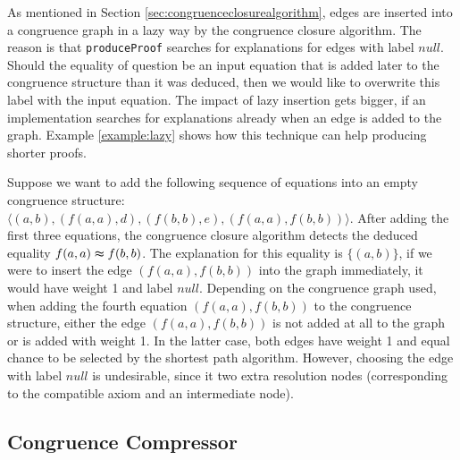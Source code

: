 As mentioned in Section \ref{sec:congruenceclosurealgorithm}, edges are inserted into a congruence graph in a lazy way by the congruence closure algorithm.
The reason is that \texttt{produceProof} searches for explanations for edges with label $null$.
Should the equality of question be an input equation that is added later to the congruence structure than it was deduced, then we would like to overwrite this label with the input equation.
The impact of lazy insertion gets bigger, if an implementation searches for explanations already when an edge is added to the graph.
Example \ref{example:lazy} shows how this technique can help producing shorter proofs.

\begin{example}

Suppose we want to add the following sequence of equations into an empty congruence structure: $\langle (a,b),(f(a,a),d),(f(b,b),e),(f(a,a),f(b,b)) \rangle$.
After adding the first three equations, the congruence closure algorithm detects the deduced equality $f(a,a) \thickapprox f(b,b)$.
The explanation for this equality is $\{(a,b)\}$, if we were to insert the edge $(f(a,a),f(b,b))$ into the graph immediately, it would have weight 1 and label $null$.
Depending on the congruence graph used, when adding the fourth equation $(f(a,a),f(b,b))$ to the congruence structure, either the edge $(f(a,a),f(b,b))$ is not added at all to the graph or is added with weight 1.
In the latter case, both edges have weight 1 and equal chance to be selected by the shortest path algorithm.
However, choosing the edge with label $null$ is undesirable, since it two extra resolution nodes (corresponding to the compatible axiom and an intermediate node).

\end{example}

\FloatBarrier

\subsection*{Congruence Compressor}

